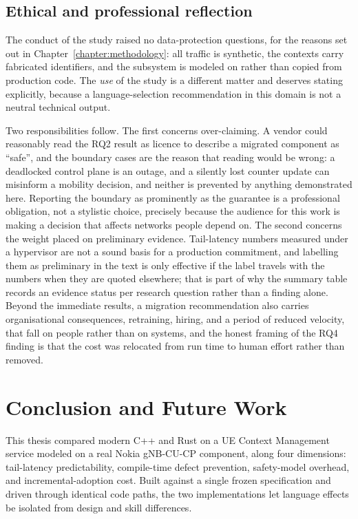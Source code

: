 \documentclass[english,twoside,openright,a4paper,censored,csm,software-track-2020]{HYthesisML}
\begin{document}
\section{Ethical and professional reflection}
The conduct of the study raised no data-protection questions, for the reasons set out in
Chapter~\ref{chapter:methodology}: all traffic is synthetic, the contexts carry fabricated
identifiers, and the subsystem is modeled on rather than copied from production code. The
\emph{use} of the study is a different matter and deserves stating explicitly, because a
language-selection recommendation in this domain is not a neutral technical output.

Two responsibilities follow. The first concerns over-claiming. A vendor could reasonably read
the RQ2 result as licence to describe a migrated component as ``safe'', and the boundary cases
are the reason that reading would be wrong: a deadlocked control plane is an outage, and a
silently lost counter update can misinform a mobility decision, and neither is prevented by
anything demonstrated here. Reporting the boundary as prominently as the guarantee is a
professional obligation, not a stylistic choice, precisely because the audience for this work
is making a decision that affects networks people depend on. The second concerns the weight
placed on preliminary evidence. Tail-latency numbers measured under a hypervisor are not a
sound basis for a production commitment, and labelling them as preliminary in the text is only
effective if the label travels with the numbers when they are quoted elsewhere; that is part
of why the summary table records an evidence status per research question rather than a
finding alone. Beyond the immediate results, a migration recommendation also carries
organisational consequences, retraining, hiring, and a period of reduced velocity, that fall
on people rather than on systems, and the honest framing of the RQ4 finding is that the cost
was relocated from run time to human effort rather than removed.

\chapter{Conclusion and Future Work\label{chapter:conclusions}}

This thesis compared modern C++ and Rust on a UE Context Management service modeled on a real
Nokia gNB-CU-CP component, along four dimensions: tail-latency predictability, compile-time
defect prevention, safety-model overhead, and incremental-adoption cost. Built against a single
frozen specification and driven through identical code paths, the two implementations let
language effects be isolated from design and skill differences.
\end{document}

